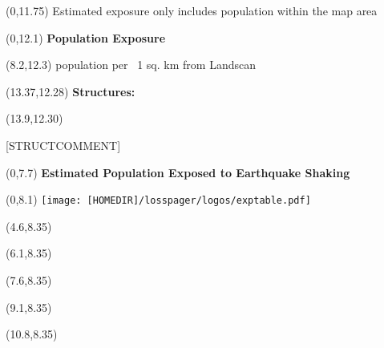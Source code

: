 \documentclass[6pt]{article}
\begin{document}
\begin{textblock}{10}(0,11.75)
{\footnotesize *Estimated exposure only includes population within the map area}
\end{textblock}

\begin{textblock}{7.5}(0,12.1)
\fontsize{14}{16.8}\textbf{Population Exposure}
\end{textblock}

\begin{textblock}{7.5}(8.2,12.3)
{\footnotesize population per ~1 sq. km from Landscan}
\end{textblock}
\begin{textblock}{7.5}(13.37,12.28)
\fontsize{9}{16.8}\textbf{Structures:}
\end{textblock}

\begin{textblock}{6.5}(13.9,12.30)
\begin{spacing}{0.85}
\begin{flushleft}
{\small [STRUCTCOMMENT]}
\end{flushleft}
\end{spacing}
\end{textblock}

\begin{textblock}{17}(0,7.7)
\fontsize{14}{16.8}\textbf{Estimated Population Exposed to Earthquake Shaking}
\end{textblock}

\begin{textblock}{20}(0,8.1)
\texttt{[image: [HOMEDIR]/losspager/logos/exptable.pdf]}
\end{textblock}

\begin{textblock}{1.5}(4.6,8.35)
  \centering [MMI1]
\end{textblock}

\begin{textblock}{1.5}(6.1,8.35)
  \centering [MMI2-3]
\end{textblock}

\begin{textblock}{1.5}(7.6,8.35)
  \centering [MMI4]
\end{textblock}

\begin{textblock}{1.7}(9.1,8.35)
  \centering [MMI5]
\end{textblock}

\begin{textblock}{1.65}(10.8,8.35)
  \centering [MMI6]
\end{textblock}
\end{document}
